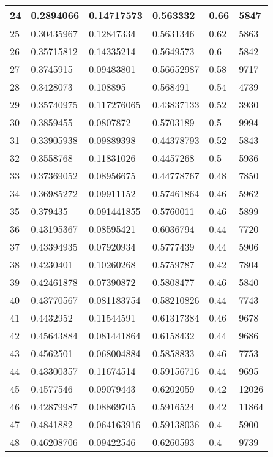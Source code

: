 \begin{longtable}{|l|l|l|l|l|l|}
24 & 0.2894066 & 0.14717573 & 0.563332 & 0.66 & 5847 \\ \hline 
25 & 0.30435967 & 0.12847334 & 0.5631346 & 0.62 & 5863 \\ \hline 
26 & 0.35715812 & 0.14335214 & 0.5649573 & 0.6 & 5842 \\ \hline 
27 & 0.3745915 & 0.09483801 & 0.56652987 & 0.58 & 9717 \\ \hline 
28 & 0.3428073 & 0.108895 & 0.568491 & 0.54 & 4739 \\ \hline 
29 & 0.35740975 & 0.117276065 & 0.43837133 & 0.52 & 3930 \\ \hline 
30 & 0.3859455 & 0.0807872 & 0.5703189 & 0.5 & 9994 \\ \hline 
31 & 0.33905938 & 0.09889398 & 0.44378793 & 0.52 & 5843 \\ \hline 
32 & 0.3558768 & 0.11831026 & 0.4457268 & 0.5 & 5936 \\ \hline 
33 & 0.37369052 & 0.08956675 & 0.44778767 & 0.48 & 7850 \\ \hline 
34 & 0.36985272 & 0.09911152 & 0.57461864 & 0.46 & 5962 \\ \hline 
35 & 0.379435 & 0.091441855 & 0.5760011 & 0.46 & 5899 \\ \hline 
36 & 0.43195367 & 0.08595421 & 0.6036794 & 0.44 & 7720 \\ \hline 
37 & 0.43394935 & 0.07920934 & 0.5777439 & 0.44 & 5906 \\ \hline 
38 & 0.4230401 & 0.10260268 & 0.5759787 & 0.42 & 7804 \\ \hline 
39 & 0.42461878 & 0.07390872 & 0.5808477 & 0.46 & 5840 \\ \hline 
40 & 0.43770567 & 0.081183754 & 0.58210826 & 0.44 & 7743 \\ \hline 
41 & 0.4432952 & 0.11544591 & 0.61317384 & 0.46 & 9678 \\ \hline 
42 & 0.45643884 & 0.081441864 & 0.6158432 & 0.44 & 9686 \\ \hline 
43 & 0.4562501 & 0.068004884 & 0.5858833 & 0.46 & 7753 \\ \hline 
44 & 0.43300357 & 0.11674514 & 0.59156716 & 0.44 & 9695 \\ \hline 
45 & 0.4577546 & 0.09079443 & 0.6202059 & 0.42 & 12026 \\ \hline 
46 & 0.42879987 & 0.08869705 & 0.5916524 & 0.42 & 11864 \\ \hline 
47 & 0.4841882 & 0.064163916 & 0.59138036 & 0.4 & 5900 \\ \hline 
48 & 0.46208706 & 0.09422546 & 0.6260593 & 0.4 & 9739 \\ \hline 

\end{longtable}
